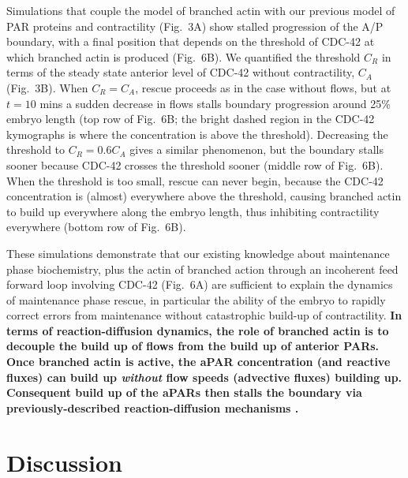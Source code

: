 \documentclass[11pt]{article}
\newcommand{\6}[1]{#1_{\text{6}}}
\newcommand{\3}[1]{#1_{\text{3}}}
\begin{document}
Simulations that couple the model of branched actin with our previous model of PAR proteins and contractility (Fig.\ 3A) show stalled progression of the A/P boundary, with a final position that depends on the threshold of CDC-42 at which branched actin is produced (Fig.\ 6B). We quantified the threshold $C_R$ in terms of the steady state anterior level of CDC-42 without contractility, $C_A$ (Fig.\ 3B). When $C_R = C_A$, rescue proceeds as in the case without flows, but at $t=10$ mins a sudden decrease in flows stalls boundary progression around 25\% embryo length (top row of Fig.\ 6B; the bright dashed region in the CDC-42 kymographs is where the concentration is above the threshold). Decreasing the threshold to $C_R = 0.6C_A$ gives a similar phenomenon, but the boundary stalls sooner because CDC-42 crosses the threshold sooner (middle row of Fig.\ 6B). When the threshold is too small, rescue can never begin, because the CDC-42 concentration is (almost) everywhere above the threshold, causing branched actin to build up everywhere along the embryo length, thus inhibiting contractility everywhere (bottom row of Fig.\ 6B). 

These simulations demonstrate that our existing knowledge about maintenance phase biochemistry, plus the actin of branched action through an incoherent feed forward loop involving CDC-42 (Fig.\ 6A) are sufficient to explain the dynamics of maintenance phase rescue, in particular the ability of the embryo to rapidly correct errors from maintenance without catastrophic build-up of contractility. \textbf{In terms of reaction-diffusion dynamics, the role of branched actin is to decouple the build up of flows from the build up of anterior PARs. Once branched actin is active, the aPAR concentration (and reactive fluxes) can build up \emph{without} flow speeds (advective fluxes) building up. Consequent build up of the aPARs then stalls the boundary via previously-described reaction-diffusion mechanisms \citep{mori2008wave,goehring2011polarization}.}


\section*{Discussion}
\end{document}
